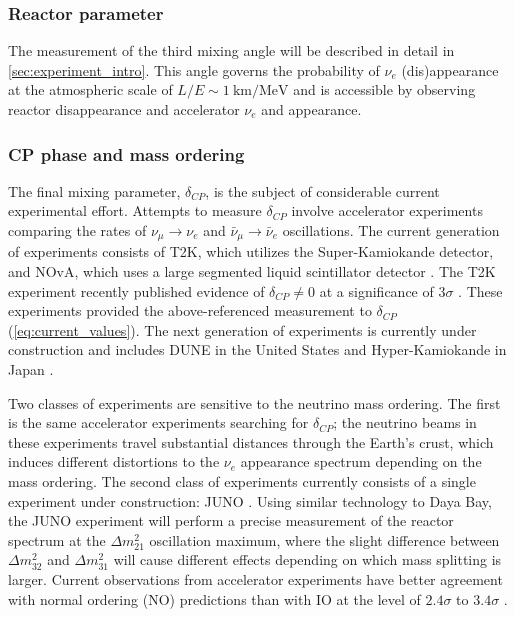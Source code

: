 \subsubsection{Reactor parameter}
The measurement of the third mixing angle \thetaot{}
will be described in detail in \cref{sec:experiment_intro}.
This angle
governs the probability of $\nu_e$ (dis)appearance
at the atmospheric scale of $L/E \sim \SI{1}{\km\per\MeV}$
and is accessible by observing reactor \nuebar{} disappearance
and accelerator $\nu_e$ and \nuebar{} appearance.

\subsubsection{CP phase and mass ordering}
The final mixing parameter, $\delta_{CP}$,
is the subject of considerable current experimental effort.
Attempts to measure $\delta_{CP}$ involve
accelerator experiments comparing the rates of
$\nu_\mu\to\nu_e$ and $\bar{\nu}_\mu\to\bar{\nu}_e$ oscillations.
The current generation of experiments consists of
T2K, which utilizes the Super-Kamiokande detector,
and NOvA,
which uses a large segmented liquid scintillator detector \cite{nova_deltacp}.
The T2K experiment recently published evidence of $\delta_{CP}\neq 0$
at a significance of $3\sigma$ \cite{t2k_deltacp}.
These experiments provided the above-referenced measurement to $\delta_{CP}$
(\cref{eq:current_values}).
The next generation of experiments is currently under construction
and includes DUNE in the United States \cite{dune_potential}
and Hyper-Kamiokande in Japan \cite{hyperk2015}.

Two classes of experiments are sensitive to the neutrino mass ordering.
The first is the same accelerator experiments searching for $\delta_{CP}$;
the neutrino beams in these experiments travel substantial distances
through the Earth's crust,
which induces different distortions to the $\nu_e$ appearance spectrum
depending on the mass ordering.
The second class of experiments currently consists of
a single experiment under construction: JUNO \cite{junoproposal2016}.
Using similar technology to Daya Bay,
the JUNO experiment will perform a precise measurement
of the reactor \nuebar{} spectrum
at the $\Delta m^2_{21}$ oscillation maximum,
where the slight difference between
$\Delta m^2_{32}$ and $\Delta m^2_{31}$
will cause different effects depending
on which mass splitting is larger.
Current observations from accelerator experiments
have better agreement with normal ordering (NO)
predictions than with IO at the level of $2.4\sigma$ to $3.4\sigma$ \cite{pdg}.

